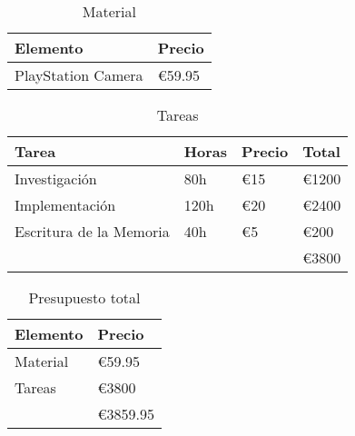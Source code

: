 \begin{table}[!ht]
\begin{center}
\begin{tabular}{|p{80mm}|p{40mm}|} \hline 
\textbf{Elemento } & \textbf{Precio} \\ \hline
PlayStation Camera &
\euro{59.95}
\\
\hline

\end{tabular}
\end{center}
\caption{Material}
\label{table:material}
\end{table}


\begin{table}[!ht]
\begin{center}
\begin{tabular}{|p{80mm}|p{20mm}|p{20mm}||p{20mm}|} \hline 
\textbf{Tarea} & \textbf{Horas} & \textbf{Precio} & \textbf{Total} \\ \hline
Investigación &
80h &
\euro{15} &
\euro{1200}
\\
\hline

Implementación &
120h &
\euro{20} &
\euro{2400}
\\
\hline

Escritura de la Memoria &
40h &
\euro{5} &
\euro{200}
\\
\hline

&
&
&
\euro{3800}
\\
\hline

\end{tabular}
\end{center}
\caption{Tareas}
\label{table:horas}
\end{table}


\begin{table}[!ht]
\begin{center}
\begin{tabular}{|p{80mm}|p{40mm}|} \hline 
\textbf{Elemento } & \textbf{Precio} \\ \hline
Material &
\euro{59.95}
\\
\hline

Tareas &
\euro{3800}
\\
\hline

&
\euro{3859.95}
\\
\hline

\end{tabular}
\end{center}
\caption{Presupuesto total}
\label{table:presupuesto}
\end{table}
